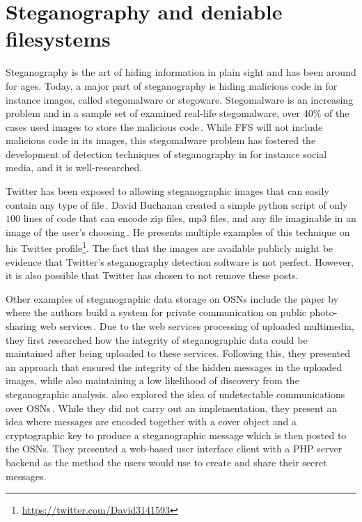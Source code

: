 \section{Steganography and deniable filesystems}
Steganography is the art of hiding information in plain sight and has been around for ages. Today, a major part of steganography is hiding malicious code in for instance images, called stegomalware or stegoware. Stegomalware is an increasing problem and in a sample set of examined \mbox{real-life} stegomalware, over 40\% of the cases used images to store the malicious code\,\cite{stichtingcuingfoundationSIMARGLStegwarePrimer2020}. While \gls{FFS} will not include malicious code in its images, this stegomalware problem has fostered the development of detection techniques of steganography in for instance social media, and it is \mbox{well-researched}. 

Twitter has been exposed to allowing steganographic images that can easily contain any type of file\,\cite{TwitterImagesCan}. David Buchanan created a simple python script of only $100$ lines of code that can encode zip files, mp3 files, and any file imaginable in an image of the user's choosing\,\cite{buchananTweetablepolyglotpng2022}. He presents multiple examples of this technique on his Twitter profile\footnote{\url{https://twitter.com/David3141593}}. The fact that the images are available publicly might be evidence that Twitter's steganography detection software is not perfect. However, it is also possible that Twitter has chosen to not remove these posts.

Other examples of steganographic data storage on \gls{OSNs} include the paper by \citeauthor{ningSecretMessageSharing2014} where the authors build a system for private communication on public \mbox{photo-sharing} web services\,\cite{ningSecretMessageSharing2014}. Due to the web services processing of uploaded multimedia, they first researched how the integrity of steganographic data could be maintained after being uploaded to these services. Following this, they presented an approach that ensured the integrity of the hidden messages in the uploaded images, while also maintaining a low likelihood of discovery from the steganographic analysis. \citeauthor{beatoUndetectableCommunicationOnline2014} also explored the idea of undetectable communications over \gls{OSNs}\,\cite{beatoUndetectableCommunicationOnline2014}. While they did not carry out an implementation, they present an idea where messages are encoded together with a cover object and a cryptographic key to produce a steganographic message which is then posted to the \gls{OSNs}. They presented a \mbox{web-based} user interface client with a PHP server backend as the method the users would use to create and share their secret messages.


